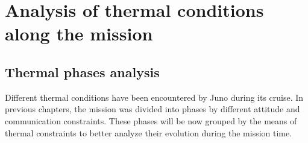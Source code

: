 \section{Analysis of thermal conditions along the mission}
\label{sec:TCS_phases}

\subsection{Thermal phases analysis}
\label{subsec: TP_analysis}

Different thermal conditions have been encountered by Juno during its cruise. In previous chapters, the mission was divided into phases by different attitude and communication constraints. These phases will be now grouped by the means of thermal constraints to better analyze their evolution during the mission time.

